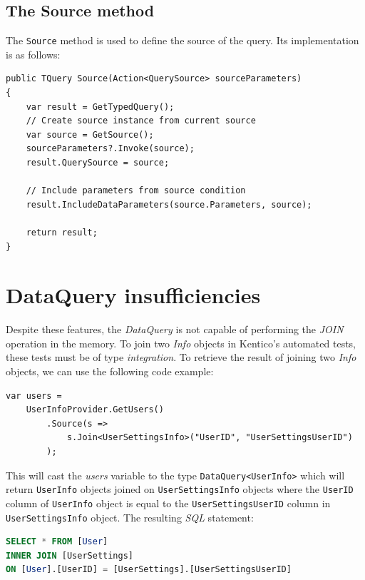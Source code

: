 \documentclass[
  print,
  table,
  nolof,
  nolot,
  nocover,
  oneside
]{fithesis3}
\begin{document}
\subsection{The Source method}
\label{source method}

The \texttt{Source} method is used to define the source of the query. Its implementation is as follows:
\begin{lstlisting}
public TQuery Source(Action<QuerySource> sourceParameters)
{
    var result = GetTypedQuery();
    // Create source instance from current source
    var source = GetSource();    
    sourceParameters?.Invoke(source);
    result.QuerySource = source;
    
    // Include parameters from source condition
    result.IncludeDataParameters(source.Parameters, source);
    
    return result;
}
\end{lstlisting}


\section{DataQuery insufficiencies}
\label{DataQuery insufficiencies}

Despite these features, the \textit{DataQuery} is not capable of performing the \textit{JOIN} operation in the memory. To join two \textit{Info} objects in Kentico's automated tests, these tests must be of type \textit{integration}. To retrieve the result of joining two \textit{Info} objects, we can use the following code example:
\begin{lstlisting}
var users =
    UserInfoProvider.GetUsers()
        .Source(s =>
            s.Join<UserSettingsInfo>("UserID", "UserSettingsUserID")
        );    
\end{lstlisting}

This will cast the \textit{users} variable to the type \texttt{DataQuery<UserInfo>} which will return \texttt{UserInfo} objects joined on \texttt{UserSettingsInfo} objects where the \texttt{UserID} column of \texttt{UserInfo} object is equal to the \texttt{UserSettingsUserID} column in \texttt{UserSettingsInfo} object. The resulting \textit{SQL} statement:
\begin{lstlisting}[language=SQL,escapechar=@,language=SQL,basicstyle=\ttfamily]
SELECT * FROM [User]
INNER JOIN [UserSettings]
ON [User].[UserID] = [UserSettings].[UserSettingsUserID]
\end{lstlisting}
\end{document}
